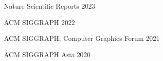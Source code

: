 
\begin{cvhonors}
    \cvhonor
	{Nature Scientific Reports}
	{}
	{}
	{2023}

    \cvhonor
	{ACM SIGGRAPH}
	{}
	{}
	{2022}
	
    \cvhonor
	{ACM SIGGRAPH, Computer Graphics Forum}
	{}
	{}
	{2021}
	
	\cvhonor
	{ACM SIGGRAPH Asia}
	{}
	{}
	{2020}

	
\end{cvhonors}